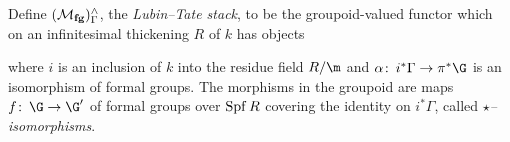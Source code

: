 \begin{definition}\label{LubinTateDefn}
Define $(\mathcal{M}_{\mathbf{fg}})^\wedge_\Gamma$, the \textit{Lubin--Tate stack}, to be the groupoid-valued functor which on an infinitesimal thickening $R$ of $k$ has objects
\begin{center}
\end{center}
where $i$ is an inclusion of $k$ into the residue field $R/\m$ and $\alpha\co i^* \Gamma \to \pi^* \G$ is an isomorphism of formal groups.  The morphisms in the groupoid are maps $f\co \G \to \G'$ of formal groups over $\operatorname{Spf} R$ covering the identity on $i^* \Gamma$, called \textit{$\star$--isomorphisms}.
\end{definition}

